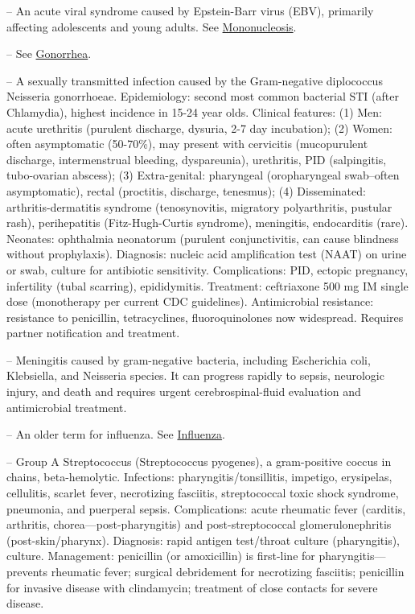 -- An acute viral syndrome caused by Epstein-Barr virus (EBV), primarily affecting adolescents and young adults. See \hyperlink{Mononucleosis}{Mononucleosis}.

-- See \hyperlink{Gonorrhea}{Gonorrhea}.

-- A sexually transmitted infection caused by the Gram-negative diplococcus Neisseria gonorrhoeae. Epidemiology: second most common bacterial STI (after Chlamydia), highest incidence in 15-24 year olds. Clinical features: (1) Men: acute urethritis (purulent discharge, dysuria, 2-7 day incubation); (2) Women: often asymptomatic (50-70\%), may present with cervicitis (mucopurulent discharge, intermenstrual bleeding, dyspareunia), urethritis, PID (salpingitis, tubo-ovarian abscess); (3) Extra-genital: pharyngeal (oropharyngeal swab--often asymptomatic), rectal (proctitis, discharge, tenesmus); (4) Disseminated: arthritis-dermatitis syndrome (tenosynovitis, migratory polyarthritis, pustular rash), perihepatitis (Fitz-Hugh-Curtis syndrome), meningitis, endocarditis (rare). Neonates: ophthalmia neonatorum (purulent conjunctivitis, can cause blindness without prophylaxis). Diagnosis: nucleic acid amplification test (NAAT) on urine or swab, culture for antibiotic sensitivity. Complications: PID, ectopic pregnancy, infertility (tubal scarring), epididymitis. Treatment: ceftriaxone 500 mg IM single dose (monotherapy per current CDC guidelines). Antimicrobial resistance: resistance to penicillin, tetracyclines, fluoroquinolones now widespread. Requires partner notification and treatment.

-- Meningitis caused by gram-negative bacteria, including Escherichia coli, Klebsiella, and Neisseria species. It can progress rapidly to sepsis, neurologic injury, and death and requires urgent cerebrospinal-fluid evaluation and antimicrobial treatment.

-- An older term for influenza. See \hyperlink{Influenza}{Influenza}.

-- Group A Streptococcus (Streptococcus pyogenes), a gram-positive coccus in chains, beta-hemolytic. Infections: pharyngitis/tonsillitis, impetigo, erysipelas, cellulitis, scarlet fever, necrotizing fasciitis, streptococcal toxic shock syndrome, pneumonia, and puerperal sepsis. Complications: acute rheumatic fever (carditis, arthritis, chorea—post-pharyngitis) and post-streptococcal glomerulonephritis (post-skin/pharynx). Diagnosis: rapid antigen test/throat culture (pharyngitis), culture. Management: penicillin (or amoxicillin) is first-line for pharyngitis—prevents rheumatic fever; surgical debridement for necrotizing fasciitis; penicillin for invasive disease with clindamycin; treatment of close contacts for severe disease.

